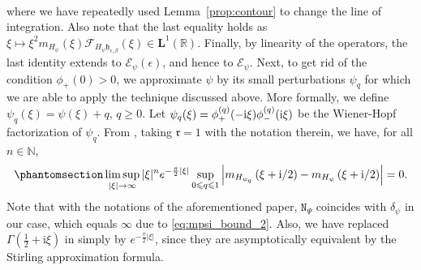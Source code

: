 \documentclass[12pt]{amsart}
\newcommand{\hlabel}{\phantomsection\label}
\newcommand{\hptg}[2]{\hypertarget{#1}{#2}}
\numberwithin{equation}{section}
\newcommand{\bb}{\mathbb}
\newcommand{\cc}{\mathcal}
\renewcommand{\ge}{\geqslant}
\renewcommand{\le}{\leqslant}
\newcommand{\mf}{\mathfrak}
\newcommand{\ttt}{\mathtt}
\newcommand{\bmrm}[2][2]{\mathbf{#2}^{#1}}
\newcommand{\fou}{\mathcal{F}}
\newcommand{\Hpsi}{H_\psi}
\newcommand{\eps}{\epsilon}
\newcommand{\heb}{\mf{h}_{\eps,\beta}}
\renewcommand{\i}{\mathrm{i}}
\theoremstyle{definition}
\theoremstyle{assump}
\theoremstyle{remark}
\begin{document}
{\begin{align}
\end{align}
\hptg{C69}{where we have repeatedly used Lemma~\ref{prop:contour} to change the line of integration.} Also note that the last equality holds as $\xi\mapsto\xi^2 m_{\Hpsi}(\xi)\fou_{H_\psi\heb}(\xi)\in\bmrm[1]{L}(\bb R)$. Finally, by linearity of the operators, the last identity extends to $\cc{E}_\psi(\eps)$, and hence to $\cc{E}_\psi$. \hptg{C74}{Next, to get rid of the condition $\phi_+(0)>0$, we approximate $\psi$ by its small perturbations $\psi_q$ for which we are able to apply the technique discussed above. More formally, we define $\psi_q(\xi)=\psi(\xi) +q$, $q\ge 0$. Let $\psi_q(\xi)=\phi^{(q)}_+(-{\rm{i}}\xi  )\phi^{(q)}_-({\rm{i}}\xi  )$ be the Wiener-Hopf factorization of $\psi_q$. From  \cite[Lemma~7.3, (7.66)]{patie2018}, taking  $\mathfrak{r}=1$ with the notation therein, we have, for all $n\in\bb N$,
\begin{equation}\hlabel{eq:ratio_approx}
\limsup_{|\xi|\to\infty}|\xi|^ne^{-\frac{\pi}{2}|\xi|}\sup_{0\le q\le 1}\left|m_{H_{\psi_q}}\left(\xi+{\rm{i}}/2\right)-m_{H_{\psi}}\left(\xi+{\rm{i}}/2\right)\right|=0.
\end{equation}
Note that with the notations of the aforementioned paper, $\ttt{N}_{\Psi}$ coincides with $\delta_\psi$ in our case, which equals $\infty$ due to \eqref{eq:mpsi_bound_2}. Also, we have replaced $\Gamma(\frac{1}{2}+\i\xi)$ in \cite[(7.66)]{patie2018} simply by $e^{-\frac{\pi}{2}|\xi|}$, since they are asymptotically equivalent by the Stirling approximation formula.}
}
\end{document}
